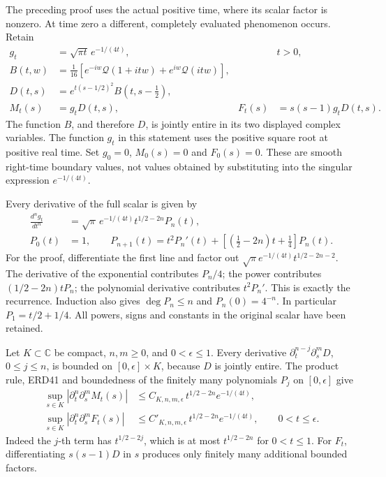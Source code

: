 \documentclass[
  10pt,
  a4paper,
]{article}
\begin{document}
The preceding proof uses the actual positive time, where its scalar
factor is nonzero. At time zero a different, completely evaluated
phenomenon occurs. Retain \[
 \begin{aligned}
 g_t&=\sqrt{\pi t}\,e^{-1/(4t)}, &&t>0,\\
 B(t,w)&=\frac1{16}
       [e^{-iw}\mathcal Q(1+itw)+e^{iw}\mathcal Q(itw)],\\
 D(t,s)&=e^{t(s-1/2)^2}B(t,s-\tfrac12),\\
 M_t(s)&=g_tD(t,s),&
 F_t(s)&=s(s-1)g_tD(t,s).
 \end{aligned}
 \tag{ERD40}
\] The function \(B\), and therefore \(D\), is jointly entire in its two
displayed complex variables. The function \(g_t\) in this statement uses
the positive square root at positive real time. Set \(g_0=0\),
\(M_0(s)=0\) and \(F_0(s)=0\). These are smooth right-time boundary
values, not values obtained by substituting into the singular expression
\(e^{-1/(4t)}\).

Every derivative of the full scalar is given by \[
 \begin{aligned}
 \frac{d^n g_t}{dt^n}
   &=\sqrt\pi\,e^{-1/(4t)}
                  t^{1/2-2n}P_n(t),\\
 P_0(t)&=1,\qquad
 P_{n+1}(t)=t^2P_n'(t)
             +\left[\left(\frac12-2n\right)t+\frac14\right]P_n(t).
 \end{aligned}
 \tag{ERD41}
\] For the proof, differentiate the first line and factor out
\(\sqrt\pi e^{-1/(4t)}t^{1/2-2n-2}\). The derivative of the exponential
contributes \(P_n/4\); the power contributes \((1/2-2n)tP_n\); the
polynomial derivative contributes \(t^2P_n'\). This is exactly the
recurrence. Induction also gives \(\deg P_n\le n\) and
\(P_n(0)=4^{-n}\). In particular \(P_1=t/2+1/4\). All powers, signs and
constants in the original scalar have been retained.

Let \(K\subset\mathbb C\) be compact, \(n,m\ge0\), and
\(0<\epsilon\le1\). Every derivative \(\partial_t^{n-j}\partial_s^mD\),
\(0\le j\le n\), is bounded on \([0,\epsilon]\times K\), because \(D\)
is jointly entire. The product rule, ERD41 and boundedness of the
finitely many polynomials \(P_j\) on \([0,\epsilon]\) give \[
 \begin{aligned}
 \sup_{s\in K}
   |\partial_t^n\partial_s^mM_t(s)|
    &\le C_{K,n,m,\epsilon}\,
          t^{1/2-2n}e^{-1/(4t)},\\
 \sup_{s\in K}
   |\partial_t^n\partial_s^mF_t(s)|
    &\le C'_{K,n,m,\epsilon}\,
          t^{1/2-2n}e^{-1/(4t)},
       \qquad 0<t\le\epsilon.
 \end{aligned}
 \tag{ERD42}
\] Indeed the \(j\)-th term has \(t^{1/2-2j}\), which is at most
\(t^{1/2-2n}\) for \(0<t\le1\). For \(F_t\), differentiating \(s(s-1)D\)
in \(s\) produces only finitely many additional bounded factors.
\end{document}
